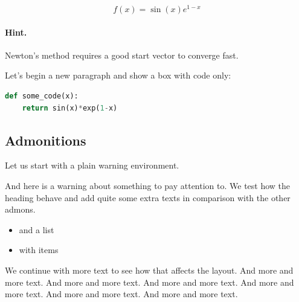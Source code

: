 \documentclass[%
oneside,                 %
final,                   %
10pt]{article}
\newenvironment{warningshaded}
{\def\FrameCommand{\fboxsep=3mm\colorbox{colors1_warning_background}}
 \MakeFramed {\advance\hsize-\width \FrameRestore}}{\endMakeFramed}
\newenvironment{warning_colors1admon}[1][Warning]{
\begin{warningshaded}
\noindent
\texttt{[image: latex\_figs/warning]}\ \ \   \textbf{#1}\\ \par
\vspace{-3mm}\nobreak\noindent\ignorespaces
}
{
\end{warningshaded}
}
\begin{document}
\begin{center}
\begin{Sbox}
\begin{minipage}{0.85\linewidth}
\begin{equation} f(x) = \sin(x)e^{1-x} \end{equation}
\end{minipage}
\end{Sbox}
\fbox{\TheSbox}
\end{center}

\paragraph{Hint.}
Newton's method requires a good start vector to converge fast.



Let's begin a new paragraph and show a box with code only:


\begin{center}
\begin{Sbox}
\begin{minipage}{0.85\linewidth}



\begin{lstlisting}[language=python,style=simple,xleftmargin=2mm]
def some_code(x):
    return sin(x)*exp(1-x)

\end{lstlisting}
\end{minipage}
\end{Sbox}
\fbox{\TheSbox}
\end{center}

\subsection{Admonitions}

Let us start with a plain warning environment.


\begin{warning_colors1admon}[Warning]
And here is a warning about something to pay attention to. We
test how the heading behave and add quite some extra texts
in comparison with the other admons.

\begin{itemize}
  \item and a list

  \item with items
\end{itemize}

\noindent
We continue with more text to see how that affects the layout.
And more and more text.
And more and more text.
And more and more text.
And more and more text.
And more and more text.
And more and more text.
\end{warning_colors1admon} %
\end{document}
